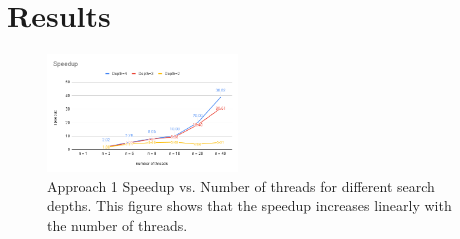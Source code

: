 \section{Results}


\begin{figure}[h]
	\centering
	\includegraphics[width=0.45\textwidth]{speedup.png}
	\vspace{-1em}
	\caption{Approach 1 Speedup vs. Number of threads for different search depths. This figure shows that the speedup increases linearly with the number of threads.}
	\label{fig:speedup}
\end{figure}

